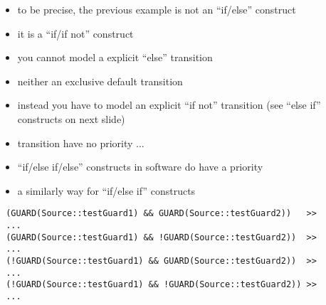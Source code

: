 \begin{frame}[fragile=singleslide]
\begin{itemize}
\item to be precise, the previous example is not an ``if/else'' construct
\item it is a ``if/if not'' construct
\item you cannot model a explicit ``else'' transition
\item neither an exclusive default transition
\item instead you have to model an explicit ``if not'' transition (see ``else if'' constructs on next slide)
\item transition have no priority ...
\item ``if/else if/else'' constructs in software do have a priority
\end{itemize}
\end{frame}





\begin{frame}[fragile=singleslide]
\begin{itemize}
\item a similarly way for ``if/else if'' constructs
\end{itemize}
\begin{lstlisting}
 (GUARD(Source::testGuard1) && GUARD(Source::testGuard2))   >>
 ...
 (GUARD(Source::testGuard1) && !GUARD(Source::testGuard2))  >>
 ...
 (!GUARD(Source::testGuard1) && GUARD(Source::testGuard2))  >>
 ...
 (!GUARD(Source::testGuard1) && !GUARD(Source::testGuard2)) >>
 ...
\end{lstlisting}
\end{frame}











